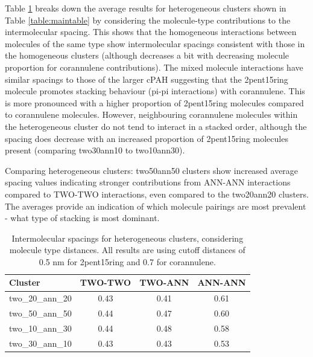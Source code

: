 Table \ref{table:mixedintermolecdists} breaks down the average results for heterogeneous clusters shown in Table \ref{table:maintable} by considering the molecule-type contributions to the intermolecular spacing. %
This shows that the homogeneous interactions between molecules of the same type show intermolecular spacings consistent with those in the homogeneous clusters (although decreases a bit with decreasing molecule proportion for corannulene contributions). The mixed molecule interactions have similar spacings to those of the larger cPAH suggesting that the 2pent15ring molecule promotes stacking behaviour (pi-pi interactions) with corannulene.  This is more pronounced with a higher proportion of 2pent15ring molecules compared to corannulene molecules. 
However, neighbouring corannulene molecules within the heterogeneous cluster do not tend to interact in a stacked order, although the spacing does decrease with an increased proportion of 2pent15ring molecules present (comparing two30ann10 to two10ann30). 

Comparing heterogeneous clusters: two50ann50 clusters show increased average spacing values indicating stronger contributions from ANN-ANN interactions compared to TWO-TWO interactions, even compared to the two20ann20 clusters. %
The averages provide an indication of which molecule pairings are most prevalent - what type of stacking is most dominant. %

%
\begin{table}[]
\centering
\caption{Intermolecular spacings for heterogeneous clusters, considering molecule type distances. All results are using cutoff distances of 0.5 nm for 2pent15ring and 0.7 for corannulene.}
\label{table:mixedintermolecdists}
\begin{tabular}{lccc}
\hline
Cluster & TWO-TWO & TWO-ANN & ANN-ANN \\ \hline
two\_20\_ann\_20 & 0.43 & 0.41 & 0.61 \\
two\_50\_ann\_50 & 0.44 & 0.47 & 0.60 \\
two\_10\_ann\_30 & 0.44 & 0.48 & 0.58 \\
two\_30\_ann\_10 & 0.43 & 0.43 & 0.53 \\ \hline
\end{tabular}
\end{table}
%

